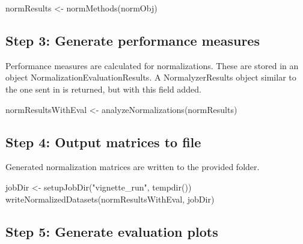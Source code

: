 \documentclass[]{article}
\newcommand{\hlstr}[1]{\textcolor[rgb]{0.251,0.627,0.251}{#1}}%
\newcommand{\hlstd}[1]{\textcolor[rgb]{0.251,0.251,0.251}{#1}}%
\newenvironment{Shaded}{\begin{myshaded}}{\end{myshaded}}
\newcommand{\StringTok}[1]{\hlstr{#1}}
\newcommand{\OtherTok}[1]{{#1}}
\newcommand{\FunctionTok}[1]{\hlstd{#1}}
\newcommand{\NormalTok}[1]{\hlstd{#1}}
\begin{document}
\begin{Shaded}
\begin{Highlighting}[]
\NormalTok{normResults }\OtherTok{\textless{}{-}} \FunctionTok{normMethods}\NormalTok{(normObj)}
\end{Highlighting}
\end{Shaded}

\hypertarget{step-3-generate-performance-measures}{%
\subsection{Step 3: Generate performance measures}\label{step-3-generate-performance-measures}}

Performance measures are calculated for normalizations. These are stored in an object NormalizationEvaluationResults. A NormalyzerResults object similar to the one sent in is returned, but with this field added.

\begin{Shaded}
\begin{Highlighting}[]
\NormalTok{normResultsWithEval }\OtherTok{\textless{}{-}} \FunctionTok{analyzeNormalizations}\NormalTok{(normResults)}
\end{Highlighting}
\end{Shaded}

\hypertarget{step-4-output-matrices-to-file}{%
\subsection{Step 4: Output matrices to file}\label{step-4-output-matrices-to-file}}

Generated normalization matrices are written to the provided folder.

\begin{Shaded}
\begin{Highlighting}[]
\NormalTok{jobDir }\OtherTok{\textless{}{-}} \FunctionTok{setupJobDir}\NormalTok{(}\StringTok{"vignette\_run"}\NormalTok{, }\FunctionTok{tempdir}\NormalTok{())}
\FunctionTok{writeNormalizedDatasets}\NormalTok{(normResultsWithEval, jobDir)}
\end{Highlighting}
\end{Shaded}

\hypertarget{step-5-generate-evaluation-plots}{%
\subsection{Step 5: Generate evaluation plots}\label{step-5-generate-evaluation-plots}}
\end{document}
